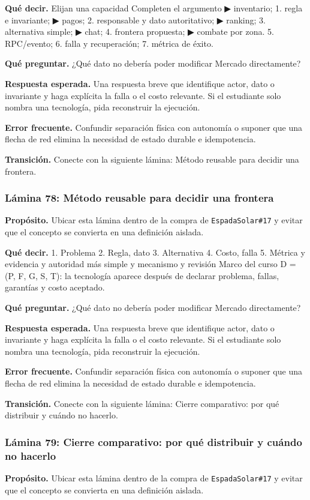 \documentclass[variant=docente,cover=institutional,mode=screen]{ua-engineering-v6-article}
\begin{document}
\textbf{Qué decir.} Elijan una capacidad Completen el argumento ▶ inventario; 1. regla e invariante; ▶ pagos; 2. responsable y dato autoritativo; ▶ ranking; 3. alternativa simple; ▶ chat; 4. frontera propuesta; ▶ combate por zona. 5. RPC/evento; 6. falla y recuperación; 7. métrica de éxito.

\textbf{Qué preguntar.} ¿Qué dato no debería poder modificar Mercado directamente?

\textbf{Respuesta esperada.} Una respuesta breve que identifique actor, dato o invariante y haga explícita la falla o el costo relevante. Si el estudiante solo nombra una tecnología, pida reconstruir la ejecución.

\textbf{Error frecuente.} Confundir separación física con autonomía o suponer que una flecha de red elimina la necesidad de estado durable e idempotencia.

\textbf{Transición.} Conecte con la siguiente lámina: Método reusable para decidir una frontera.

\subsubsection*{Lámina 78: Método reusable para decidir una frontera}
\textbf{Propósito.} Ubicar esta lámina dentro de la compra de \texttt{EspadaSolar\#17} y evitar que el concepto se convierta en una definición aislada.

\textbf{Qué decir.} 1. Problema 2. Regla, dato 3. Alternativa 4. Costo, falla 5. Métrica y evidencia y autoridad más simple y mecanismo y revisión Marco del curso D = (P, F, G, S, T): la tecnología aparece después de declarar problema, fallas, garantías y costo aceptado.

\textbf{Qué preguntar.} ¿Qué dato no debería poder modificar Mercado directamente?

\textbf{Respuesta esperada.} Una respuesta breve que identifique actor, dato o invariante y haga explícita la falla o el costo relevante. Si el estudiante solo nombra una tecnología, pida reconstruir la ejecución.

\textbf{Error frecuente.} Confundir separación física con autonomía o suponer que una flecha de red elimina la necesidad de estado durable e idempotencia.

\textbf{Transición.} Conecte con la siguiente lámina: Cierre comparativo: por qué distribuir y cuándo no hacerlo.

\subsubsection*{Lámina 79: Cierre comparativo: por qué distribuir y cuándo no hacerlo}
\textbf{Propósito.} Ubicar esta lámina dentro de la compra de \texttt{EspadaSolar\#17} y evitar que el concepto se convierta en una definición aislada.
\end{document}
